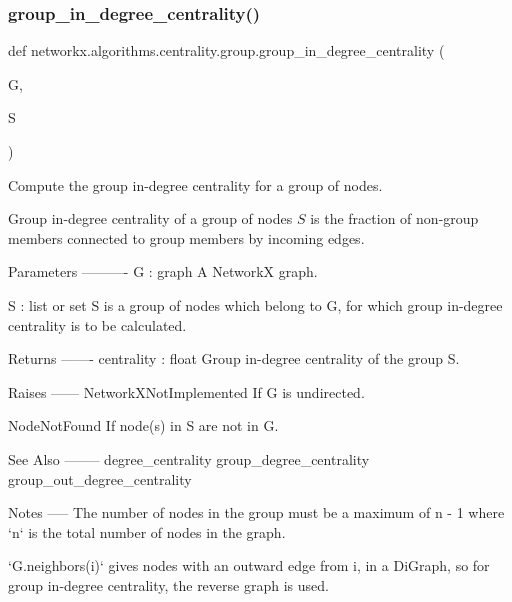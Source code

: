 \subsubsection{\texorpdfstring{group\+\_\+in\+\_\+degree\+\_\+centrality()}{group\_in\_degree\_centrality()}}
{\footnotesize\ttfamily def networkx.\+algorithms.\+centrality.\+group.\+group\+\_\+in\+\_\+degree\+\_\+centrality (\begin{DoxyParamCaption}\item[{}]{G,  }\item[{}]{S }\end{DoxyParamCaption})}

\begin{DoxyVerb}Compute the group in-degree centrality for a group of nodes.

Group in-degree centrality of a group of nodes $S$ is the fraction
of non-group members connected to group members by incoming edges.

Parameters
----------
G : graph
   A NetworkX graph.

S : list or set
   S is a group of nodes which belong to G, for which group in-degree
   centrality is to be calculated.

Returns
-------
centrality : float
   Group in-degree centrality of the group S.

Raises
------
NetworkXNotImplemented
   If G is undirected.

NodeNotFound
   If node(s) in S are not in G.

See Also
--------
degree_centrality
group_degree_centrality
group_out_degree_centrality

Notes
-----
The number of nodes in the group must be a maximum of n - 1 where `n`
is the total number of nodes in the graph.

`G.neighbors(i)` gives nodes with an outward edge from i, in a DiGraph,
so for group in-degree centrality, the reverse graph is used.
\end{DoxyVerb}
 \mbox{\label{namespacenetworkx_1_1algorithms_1_1centrality_1_1group_a9858fd832390e48c10424a763d2b78ef}} 
